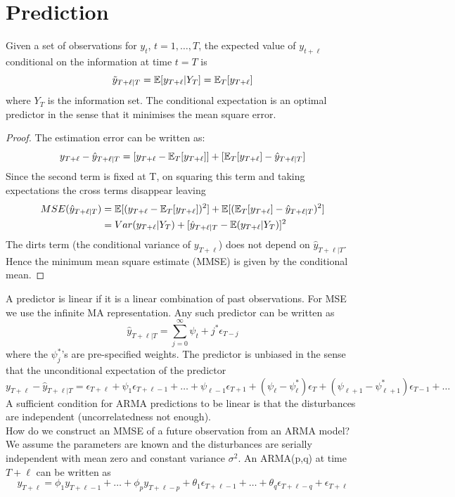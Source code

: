 \documentclass[DIV=14,titlepage=false]{scrreprt}
\begin{document}
\section{Prediction}
Given a set of observations for $y_t$, $t = 1, \dots, T$, the expected value of $y_{t+\ell}$ conditional on the information at time $t=T$ is
\[
\tilde{y}_{T+\ell|T} = \mathbb{E}[y_{T+\ell}|Y_T] = \mathbb{E}_T [y_{T+\ell}] 
\]
where $Y_T$ is the information set. The conditional expectation is an optimal predictor in the sense that it minimises the mean square error.
\begin{proof}
    The estimation error can be written as:
    \[
        y_{T+\ell} - \hat y_{T+\ell|T} = [y_{T+\ell} - \mathbb{E}_T[y_{T+\ell}]] + [\mathbb{E}_T[y_{T+\ell}] - \hat y_{T+\ell|T}]
    \]
    Since the second term is fixed at T, on squaring this term and taking expectations the cross terms disappear leaving
    \begin{align*}
        MSE(\hat y_{T+\ell|T}) &= \mathbb{E}[(y_{T+\ell} - \mathbb{E}_T[y_{T+\ell}])^2] + \mathbb{E}[(\mathbb{E}_T[y_{T+\ell}] - \hat y_{T+\ell|T})^2]\\
        &= Var(y_{T+\ell}|Y_T)+ [\hat y_{T+\ell|T} - \mathbb{E}(y_{T+\ell}|Y_T)]^2
    \end{align*}
    The dirts term (the conditional variance of $y_{T+\ell}$) does not depend on $\hat y_{T+\ell|T}$. Hence the minimum mean square estimate (MMSE) is given by the conditional mean.
\end{proof}
A predictor is linear if it is a linear combination of past observations. For MSE we use the infinite MA representation. Any such predictor can be written as 
\[
    \hat y_{T+\ell|T} = \sum_{j=0}^{\infty} \psi_t+j^* \epsilon_{T-j}
\]
where the $\psi_j^*$'s are pre-specified weights. The predictor is unbiased in the sense that the unconditional expectation of the predictor 
\[ y_{T+\ell} - \hat y_{T+\ell|T} = \epsilon_{T+\ell} + \psi_1 \epsilon_{T+\ell-1} + \dots + \psi_{\ell-1} \epsilon_{T+1} + (\psi_{\ell}-\psi_{\ell}^*) \epsilon_T + (\psi_{\ell+1} - \psi_{\ell+1}^*) \epsilon_{T-1} + \dots \]
A sufficient condition for ARMA predictions to be linear is that the disturbances are independent (uncorrelatedness not enough).\\
How do we construct an MMSE of a future observation from an ARMA model? We assume the parameters are known and the disturbances are serially independent with mean zero and constant variance $\sigma^2$. An ARMA(p,q) at time $T+\ell$ can be written as
\[
    y_{T+\ell} = \phi_1 y_{T+\ell-1} + \dots + \phi_p y_{T+\ell-p} + \theta_1 \epsilon_{T+\ell-1} + \dots + \theta_q \epsilon_{T+\ell-q} + \epsilon_{T+\ell}
\]
\end{document}
